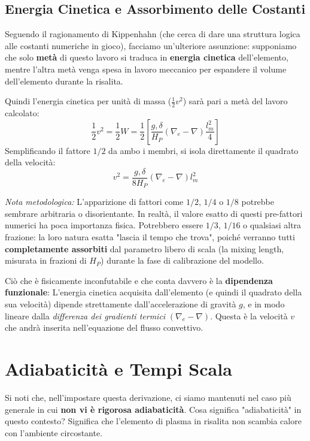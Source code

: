 \subsection{Energia Cinetica e Assorbimento delle Costanti}
Seguendo il ragionamento di Kippenhahn (che cerca di dare una struttura logica alle costanti numeriche in gioco), facciamo un'ulteriore assunzione: supponiamo che solo \textbf{metà} di questo lavoro si traduca in \textbf{energia cinetica} dell'elemento, mentre l'altra metà venga spesa in lavoro meccanico per espandere il volume dell'elemento durante la risalita.

Quindi l'energia cinetica per unità di massa ($\frac{1}{2}v^2$) sarà pari a metà del lavoro calcolato:
\begin{equation}
\frac{1}{2} v^2 = \frac{1}{2} W = \frac{1}{2} \left[ \frac{g , \delta}{H_P} (\nabla_e - \nabla) \frac{l_m^2}{4} \right]
\end{equation}
Semplificando il fattore $1/2$ da ambo i membri, si isola direttamente il quadrato della velocità:
\begin{equation}
v^2 = \frac{g , \delta}{8 H_P} (\nabla_e - \nabla) l_m^2
\end{equation}

\textit{Nota metodologica:} L'apparizione di fattori come $1/2$, $1/4$ o $1/8$ potrebbe sembrare arbitraria o disorientante. In realtà, il valore esatto di questi pre-fattori numerici ha poca importanza fisica. Potrebbero essere $1/3$, $1/16$ o qualsiasi altra frazione: la loro natura esatta "lascia il tempo che trova", poiché verranno tutti \textbf{completamente assorbiti} dal parametro libero di scala (la mixing length, misurata in frazioni di $H_P$) durante la fase di calibrazione del modello.

Ciò che è fisicamente inconfutabile e che conta davvero è la \textbf{dipendenza funzionale}:
L'energia cinetica acquisita dall'elemento (e quindi il quadrato della sua velocità) dipende strettamente dall'accelerazione di gravità $g$, e in modo lineare dalla \textit{differenza dei gradienti termici} $(\nabla_e - \nabla)$.
Questa è la velocità $v$ che andrà inserita nell'equazione del flusso convettivo.

\section{Adiabaticità e Tempi Scala}

Si noti che, nell'impostare questa derivazione, ci siamo mantenuti nel caso più generale in cui \textbf{non vi è rigorosa adiabaticità}.
Cosa significa "adiabaticità" in questo contesto? Significa che l'elemento di plasma in risalita non scambia calore con l'ambiente circostante.

